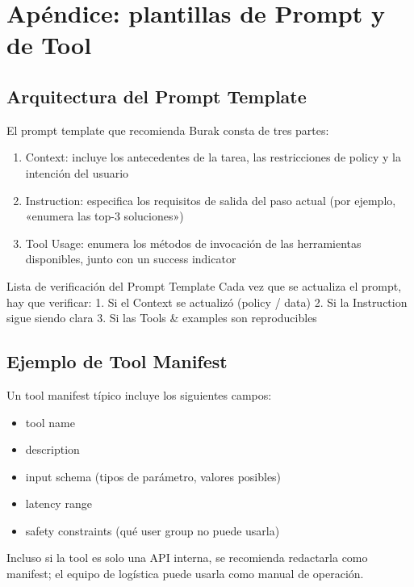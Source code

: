 \section{Apéndice: plantillas de Prompt y de Tool}

\subsection{Arquitectura del Prompt Template}

El prompt template que recomienda Burak consta de tres partes:

\begin{enumerate}
    \item Context: incluye los antecedentes de la tarea, las restricciones de policy y la intención del usuario
    \item Instruction: especifica los requisitos de salida del paso actual (por ejemplo, «enumera las top-3 soluciones»)
    \item Tool Usage: enumera los métodos de invocación de las herramientas disponibles, junto con un success indicator
\end{enumerate}

\begin{knowledgebox}{Lista de verificación del Prompt Template}
Cada vez que se actualiza el prompt, hay que verificar:
1. Si el Context se actualizó (policy / data)
2. Si la Instruction sigue siendo clara
3. Si las Tools \& examples son reproducibles
\end{knowledgebox}

\subsection{Ejemplo de Tool Manifest}

Un tool manifest típico incluye los siguientes campos:

\begin{itemize}
    \item tool name
    \item description
    \item input schema (tipos de parámetro, valores posibles)
    \item latency range
    \item safety constraints (qué user group no puede usarla)
\end{itemize}

Incluso si la tool es solo una API interna, se recomienda redactarla como manifest; el equipo de logística puede usarla como manual de operación.

